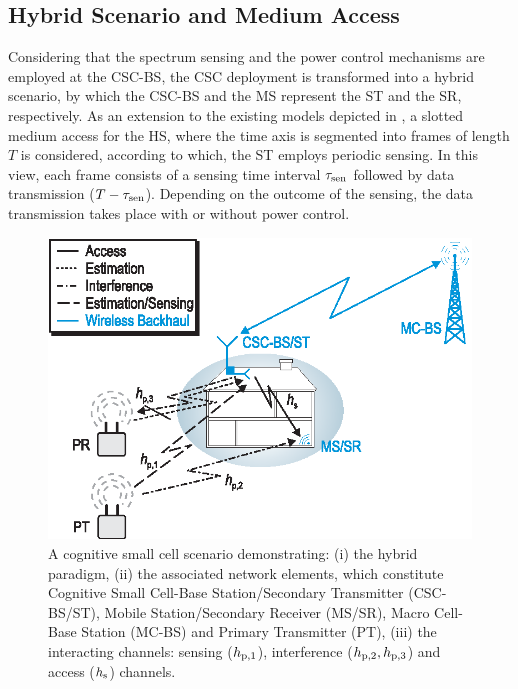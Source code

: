 \subsection{Hybrid Scenario and Medium Access}
Considering that the spectrum sensing and the power control mechanisms are employed at the CSC-BS, the CSC deployment is transformed into a hybrid scenario, by which the CSC-BS and the MS represent the ST and the SR, respectively. As an extension to the existing models depicted in \cite{Kang09, Sharma14}, a slotted medium access for the HS, where the time axis is segmented into frames of length $T$ is considered, according to which, the ST employs periodic sensing. In this view, each frame consists of a sensing time interval $\tau_{\text{sen}}$ followed by data transmission ($T - \tau_{\text{sen}}$). Depending on the outcome of the sensing, the data transmission takes place with or without power control. 
\begin{figure}[!t]
\centering
\includegraphics[width = \figscalet]{figures/CR_Scenario_Hybrid}
\caption{A cognitive small cell scenario demonstrating: (i) the hybrid paradigm, (ii) the associated network elements, which constitute Cognitive Small Cell-Base Station/Secondary Transmitter (CSC-BS/ST), Mobile Station/Secondary Receiver (MS/SR), Macro Cell-Base Station (MC-BS) and Primary Transmitter (PT), (iii) the interacting channels: sensing ($h_{\text{p,1}}$), interference ($h_{\text{p,2}}, h_{\text{p,3}}$) and access ($h_{\text{s}}$) channels.}
\label{fig_HS:scenario}
\end{figure}

